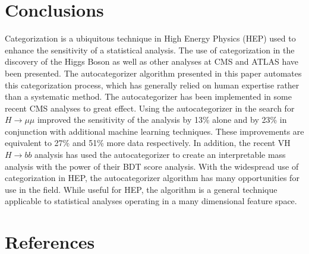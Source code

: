 \documentclass[review]{elsarticle}
\begin{document}


\section{Conclusions}
\label{conc}
Categorization is a ubiquitous technique in High Energy Physics (HEP) used to enhance the sensitivity of a statistical analysis. The use of categorization in the discovery of the Higgs Boson as well as other analyses at CMS and ATLAS have been presented. The autocategorizer algorithm presented in this paper automates this categorization process, which has generally relied on human expertise rather than a systematic method. The autocategorizer has been implemented in some recent CMS analyses to great effect. Using the autocategorizer in the search for $H\rightarrow\mu\mu$ improved the sensitivity of the analysis by 13\% alone and by 23\% in conjunction with additional machine learning techniques. These improvements are equivalent to 27\% and 51\% more data respectively. In addition, the recent VH $H\rightarrow bb$ analysis has used the autocategorizer to create an interpretable mass analysis with the power of their BDT score analysis. With the widespread use of categorization in HEP, the autocategorizer algorithm has many opportunities for use in the field. While useful for HEP, the algorithm is a general technique applicable to statistical analyses operating in a many dimensional feature space. 

\section*{References}


\end{document}
